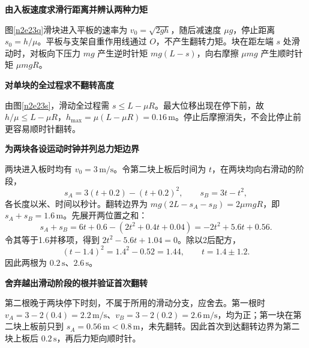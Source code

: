 \begin{solution}\textbf{由入板速度求滑行距离并辨认两种力矩}\par\nobreak
图\ref{n2e23q}滑块进入平板的速率为 $v_0=\sqrt{2gh}$，随后减速度 $\mu g$，停止距离 $s_0=h/\mu$。平板与支架自重作用线通过 $O$，不产生翻转力矩。块在距左端 $s$ 处滑动时，对板向下压力 $mg$ 产生逆时针矩 $mg(L-s)$，向右摩擦 $\mu mg$ 产生顺时针矩 $\mu mgR$。



\par\medskip{}\noindent\textbf{对单块的全过程求不翻转高度}\par\nobreak
由图\ref{n2e23s}，滑动全过程需 $s\le L-\mu R$。最大位移出现在停下前，故 $h/\mu\le L-\mu R$，$h_{\max}=\mu(L-\mu R)=0.16\,\mathrm m$。停止后摩擦消失，不会比停止前更容易顺时针翻转。



\par\medskip{}\noindent\textbf{为两块各设运动时钟并列总力矩边界}\par\nobreak
两块进入板时均有 $v_0=3\,\mathrm{m/s}$。令第二块上板后时间为 $t$，在两块均向右滑动的阶段，
\[s_A=3(t+0.2)-(t+0.2)^2,\qquad s_B=3t-t^2,\]
各长度以米、时间以秒计。翻转边界为 $mg(2L-s_A-s_B)=2\mu mgR$，即 $s_A+s_B=1.6\,\mathrm m$。先展开两位置之和：
\[
 s_A+s_B=6t+0.6-(2t^2+0.4t+0.04)
 =-2t^2+5.6t+0.56.
\]
令其等于1.6并移项，得到 $2t^2-5.6t+1.04=0$。除以2后配方，
\[
 (t-1.4)^2=1.4^2-0.52=1.44,
 \qquad t=1.4\pm1.2.
\]
因此两根为 $0.2\,\mathrm s$、$2.6\,\mathrm s$。



\par\medskip{}\noindent\textbf{舍弃越出滑动阶段的根并验证首次翻转}\par\nobreak
第二根晚于两块停下时刻，不属于所用的滑动分支，应舍去。第一根时 $v_A=3-2(0.4)=2.2\,\mathrm{m/s}$、$v_B=3-2(0.2)=2.6\,\mathrm{m/s}$，均为正；第一块在第二块上板前只到 $s_A=0.56\,\mathrm m<0.8\,\mathrm m$，未先翻转。因此首次到达翻转边界为第二块上板后 $0.2\,\mathrm s$，再后力矩向顺时针。
\end{solution}

